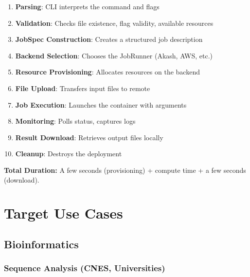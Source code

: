 \documentclass[11pt,a4paper]{article}
\begin{document}
	\begin{enumerate}
		\item \textbf{Parsing}: CLI interprets the command and flags
		
		\item \textbf{Validation}: Checks file existence, flag validity, available resources
		
		\item \textbf{JobSpec Construction}: Creates a structured job description
		
		\item \textbf{Backend Selection}: Chooses the JobRunner (Akash, AWS, etc.)
		
		\item \textbf{Resource Provisioning}: Allocates resources on the backend
		
		\item \textbf{File Upload}: Transfers input files to remote
		
		\item \textbf{Job Execution}: Launches the container with arguments
		
		\item \textbf{Monitoring}: Polls status, captures logs
		
		\item \textbf{Result Download}: Retrieves output files locally
		
		\item \textbf{Cleanup}: Destroys the deployment
	\end{enumerate}
	
	\textbf{Total Duration:} A few seconds (provisioning) + compute time + a few seconds (download).
	
	\newpage
	
	\section{Target Use Cases}
	
	\subsection{Bioinformatics}
	
	\subsubsection{Sequence Analysis (CNES, Universities)}
	
\end{document}

